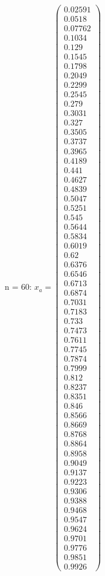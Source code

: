 \documentclass{udpreport}
\begin{document}
\begin{enumerate}
\begin{enumerate}
\begin{itemize}
\begin{itemize}
				n = 60: $x_{a} = \left(\begin{array}{c} 0.02591\\ 0.0518\\ 0.07762\\ 0.1034\\ 0.129\\ 0.1545\\ 0.1798\\ 0.2049\\ 0.2299\\ 0.2545\\ 0.279\\ 0.3031\\ 0.327\\ 0.3505\\ 0.3737\\ 0.3965\\ 0.4189\\ 0.441\\ 0.4627\\ 0.4839\\ 0.5047\\ 0.5251\\ 0.545\\ 0.5644\\ 0.5834\\ 0.6019\\ 0.62\\ 0.6376\\ 0.6546\\ 0.6713\\ 0.6874\\ 0.7031\\ 0.7183\\ 0.733\\ 0.7473\\ 0.7611\\ 0.7745\\ 0.7874\\ 0.7999\\ 0.812\\ 0.8237\\ 0.8351\\ 0.846\\ 0.8566\\ 0.8669\\ 0.8768\\ 0.8864\\ 0.8958\\ 0.9049\\ 0.9137\\ 0.9223\\ 0.9306\\ 0.9388\\ 0.9468\\ 0.9547\\ 0.9624\\ 0.9701\\ 0.9776\\ 0.9851\\ 0.9926 \end{array}\right)$	
				

\end{itemize}
\end{itemize}
\end{enumerate}
\end{enumerate}
\end{document}
